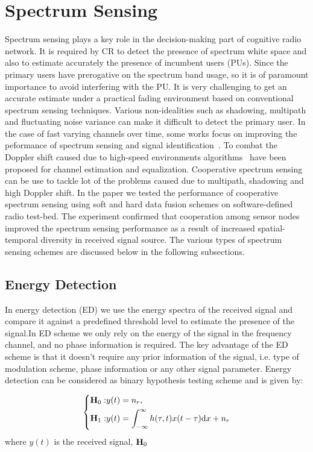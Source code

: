 \section{Spectrum Sensing}
Spectrum sensing plays a key role in the decision-making part of cognitive radio network. It is required by CR to detect the presence of spectrum white space and also to estimate accurately the presence of incumbent users (PUs). Since the primary users have prerogative on the spectrum band usage, so it is of paramount importance to avoid interfering with the PU. It is very challenging to get an accurate estimate under a practical fading environment based on conventional spectrum sensing techniques. Various non-idealities such as shadowing, multipath and fluctuating noise variance can make it difficult to detect the primary user. In the case of fast  varying  channels over time, some works focus on improving the peformance of spectrum sensing and signal identification~\cite{hassan2012blind,kharbech2013blind,hassan2009automatic}. To combat the Doppler shift caused due to high-speed environments algorithms~\cite{simon2013iterative} have been proposed for channel estimation and equalization. Cooperative spectrum sensing~\cite{ksgill} can be use to tackle lot of the problems caused due to multipath, shadowing and high Doppler shift. In the paper we tested the performance of cooperative spectrum sensing using soft and hard data fusion schemes on software-defined radio test-bed. The experiment confirmed that cooperation among sensor nodes improved the spectrum sensing performance as a result of increased spatial-temporal diversity in received signal source. The various types of spectrum sensing schemes are discussed below in the following subsections.

\subsection{Energy Detection}
In energy detection (ED) we use the energy spectra of the received signal and compare it against a predefined threshold level to estimate the presence of the signal.In ED scheme we only rely on the energy of the signal in the frequency channel, and no phase information is required. The key advantage of the ED scheme is that it doesn't require any prior information of the signal, i.e. type of modulation scheme, phase information or any other signal parameter. Energy detection can be considered as binary hypothesis testing scheme and is given by:

\begin{equation}
     \left\{
     \begin{aligned}
   \mathbf{H}_0:&y(t)= n_{r},\\
   \mathbf{H}_1:&y(t) =\int_{-\infty}^{\infty}h(\tau,t)x(t-\tau)\mathrm{d}x+n_{r}
    \end{aligned}
    \right.
\end{equation}
where $y(t)$ is the received signal, $\mathbf{H}_0$

